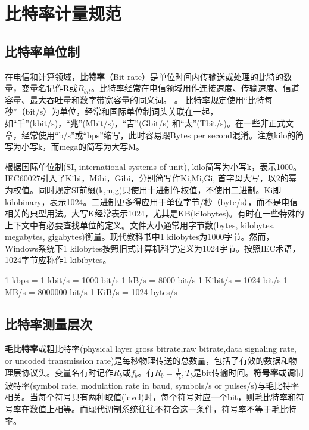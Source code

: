 

\section{比特率计量规范}
\subsection{比特率单位制}

在电信和计算领域，\textbf{比特率}（Bit rate）是单位时间内传输送或处理的比特的数量，变量名记作R\cite{wikipedia}或$R_{bit}$\cite{weijipedia}。比特率经常在电信领域用作连接速度、传输速度、信道容量、最大吞吐量和数字带宽容量的同义词。
。
比特率规定使用“比特每秒”（bit/s）为单位，经常和国际单位制词头关联在一起，如“千”(kbit/s)，“兆”(Mbit/s)，“吉”(Gbit/s) 和“太”(Tbit/s)。在一些非正式文章，经常使用“b/s”或“bps”缩写，此时容易跟Bytes per second混淆。注意kilo的简写为小写k，而mega的简写为大写M。

根据国际单位制(SI, international systems of unit), kilo简写为小写k，表示1000。IEC60027引入了Kibi，Mibi，Gibi，分别简写作Ki,Mi,Gi, 首字母大写，以2的幂为权值。同时规定SI前缀(k,m,g)只使用十进制作权值，不使用二进制。Ki即kilobinary，表示1024。二进制更多得应用于单位字节/秒（byte/s），而不是电信相关的典型用法。大写K经常表示1024，尤其是KB(kilobytes)。有时在一些特殊的上下文中有必要查找单位的定义。文件大小通常用字节数(bytes, kilobytes, megabytes, gigabytes)衡量。现代教科书中1 kilobytes为1000字节。然而，Windows系统下1 kilobytes按照旧式计算机科学定义为1024字节。按照IEC术语，1024字节应称作1 kibibytes。

\begin{center}
1 kbps = 1 kbit/s = 1000 bit/s
1 kB/s = 8000 bit/s
1 Kibit/s = 1024 bit/s
1 MB/s = 8000000 bit/s
1 KiB/s = 1024 bytes/s
\end{center}


\subsection{比特率测量层次}
\textbf{毛比特率}或粗比特率(physical layer gross bitrate,raw bitrate,data signaling rate, or uncoded transmission rate)是每秒物理传送的总数量，包括了有效的数据和物理层协议头。变量名有时记作$R_b$或$f_b$。有$R_b = \frac{1}{T_b},T_b$是bit传输时间。\textbf{符号率}或调制波特率(symbol rate, modulation rate in baud, symbols/s or pulses/s)与毛比特率相关。当每个符号只有两种取值(level)时，每个符号对应一个bit，则毛比特率和符号率在数值上相等。而现代调制系统往往不符合这一条件，符号率不等于毛比特率。

